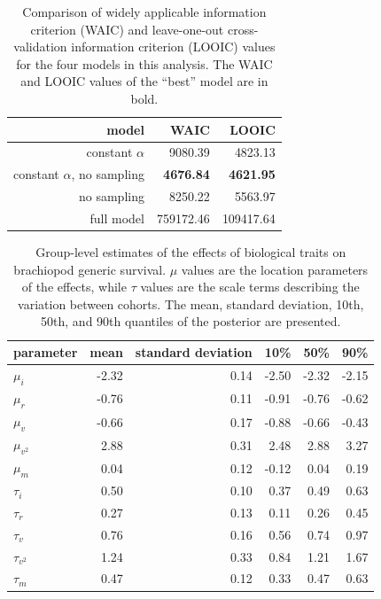 \documentclass{article}
\begin{document}
\clearpage


\begin{table}[h]
  \centering
  \caption{Comparison of widely applicable information criterion (WAIC) and leave-one-out cross-validation information criterion (LOOIC) values for the four models in this analysis. The WAIC and LOOIC values of the ``best'' model are in bold.}
  \begin{tabular}{ r r r }
    \hline
    model & \uppercase{waic} & \uppercase{looic} \\ 
    \hline
    constant \(\alpha\) & 9080.39 & 4823.13 \\ 
    constant \(\alpha\), no sampling & \textbf{4676.84} & \textbf{4621.95} \\ 
    no sampling & 8250.22 & 5563.97 \\ 
    full model & 759172.46 & 109417.64 \\ 
    \hline
  \end{tabular}
  \label{tab:comparison}
\end{table}


\begin{table}[h]
  \centering
  \caption{Group-level estimates of the effects of biological traits on brachiopod generic survival. \(\mu\) values are the location parameters of the effects, while \(\tau\) values are the scale terms describing the variation between cohorts. The mean, standard deviation, 10th, 50th, and 90th quantiles of the posterior are presented.}
  \begin{tabular}{ l r r r r r }
    \hline
    parameter & mean & standard deviation & 10\% & 50\% & 90\% \\ 
    \hline
    \(\mu_{i}\) & -2.32 & 0.14 & -2.50 & -2.32 & -2.15 \\ 
    \(\mu_{r}\) & -0.76 & 0.11 & -0.91 & -0.76 & -0.62 \\ 
    \(\mu_{v}\) & -0.66 & 0.17 & -0.88 & -0.66 & -0.43 \\ 
    \(\mu_{v^{2}}\) & 2.88 & 0.31 & 2.48 & 2.88 & 3.27 \\ 
    \(\mu_{m}\) & 0.04 & 0.12 & -0.12 & 0.04 & 0.19 \\ 
    \(\tau_{i}\) & 0.50 & 0.10 & 0.37 & 0.49 & 0.63 \\ 
    \(\tau_{r}\) & 0.27 & 0.13 & 0.11 & 0.26 & 0.45 \\ 
    \(\tau_{v}\) & 0.76 & 0.16 & 0.56 & 0.74 & 0.97 \\ 
    \(\tau_{v^{2}}\) & 1.24 & 0.33 & 0.84 & 1.21 & 1.67 \\ 
    \(\tau_{m}\) & 0.47 & 0.12 & 0.33 & 0.47 & 0.63 \\ 
    \hline
  \end{tabular}
  \label{tab:param}
\end{table}
\end{document}
